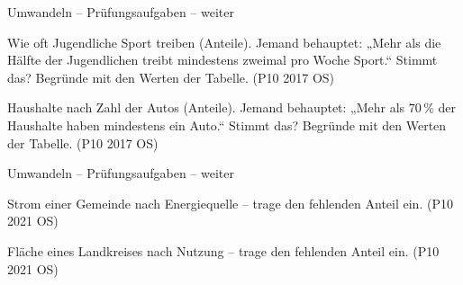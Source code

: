 \begin{aufgabe}{Umwandeln – Prüfungsaufgaben – weiter}
\begin{teile}
\steil Wie oft Jugendliche Sport treiben (Anteile). Jemand behauptet: „Mehr als die Hälfte der Jugendlichen treibt mindestens zweimal pro Woche Sport.“ Stimmt das? Begründe mit den Werten der Tabelle. \hfill (P10 2017 OS)

\steil Haushalte nach Zahl der Autos (Anteile). Jemand behauptet: „Mehr als $70\,\%$ der Haushalte haben mindestens ein Auto.“ Stimmt das? Begründe mit den Werten der Tabelle. \hfill (P10 2017 OS)

\end{teile}
\end{aufgabe}

\begin{aufgabe}{Umwandeln – Prüfungsaufgaben – weiter}
\begin{teile}
\teil Strom einer Gemeinde nach Energiequelle – trage den fehlenden Anteil ein. \hfill (P10 2021 OS)

\teil Fläche eines Landkreises nach Nutzung – trage den fehlenden Anteil ein. \hfill (P10 2021 OS)

\end{teile}
\end{aufgabe}

